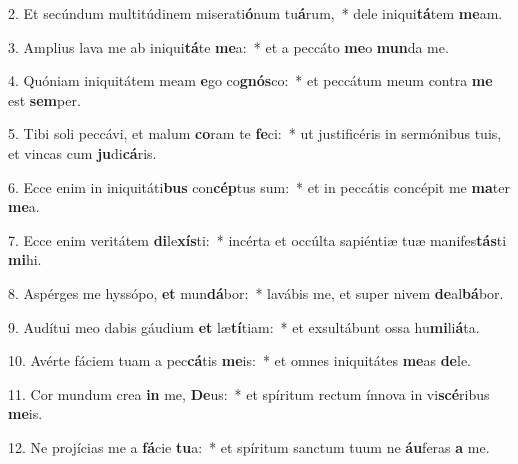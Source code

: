 
2. Et secúndum multitúdinem miserati\textbf{ó}num tu\textbf{á}rum,~* dele iniqui\textbf{tá}tem \textbf{me}am.

3. Amplius lava me ab iniqui\textbf{tá}te \textbf{me}a:~* et a peccáto \textbf{me}o \textbf{mun}da me.

4. Quóniam iniquitátem meam \textbf{e}go co\textbf{gnós}co:~* et peccátum meum contra \textbf{me} est \textbf{sem}per.

5. Tibi soli peccávi, et malum \textbf{co}ram te \textbf{fe}ci:~* ut justificéris in sermónibus tuis, et vincas cum \textbf{ju}di\textbf{cá}ris.

6. Ecce enim in iniquitáti\textbf{bus} con\textbf{cép}tus sum:~* et in peccátis concépit me \textbf{ma}ter \textbf{me}a.

7. Ecce enim veritátem \textbf{di}le\textbf{xís}ti:~* incérta et occúlta sapiéntiæ tuæ manifes\textbf{tás}ti \textbf{mi}hi.

8. Aspérges me hyssópo, \textbf{et} mun\textbf{dá}bor:~* lavábis me, et super nivem \textbf{de}al\textbf{bá}bor.

9. Audítui meo dabis gáudium \textbf{et} læ\textbf{tí}tiam:~* et exsultábunt ossa hu\textbf{mi}li\textbf{á}ta.

10. Avérte fáciem tuam a pec\textbf{cá}tis \textbf{me}is:~* et omnes iniquitátes \textbf{me}as \textbf{de}le.

11. Cor mundum crea \textbf{in} me, \textbf{De}us:~* et spíritum rectum ínnova in vi\textbf{scé}ribus \textbf{me}is.

12. Ne projícias me a \textbf{fá}cie \textbf{tu}a:~* et spíritum sanctum tuum ne \textbf{áu}feras \textbf{a} me.

